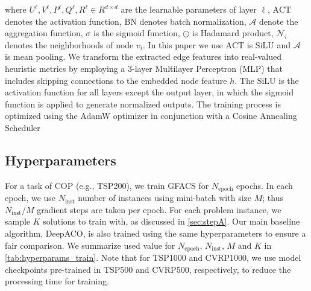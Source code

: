 \documentclass[twoside]{article}
\theoremstyle{plain}
\theoremstyle{definition}
\theoremstyle{remark}
\begin{document}
where $U^\ell, V^\ell, P^\ell, Q^\ell, R^\ell \in R^{d \times d}$ are the learnable parameters of layer $\ell$, $\text{ACT}$ denotes the activation function, BN \citep{ioffe2015batch} denotes batch normalization, $\mathcal{A}$ denote the aggregation function, $\sigma$ is the sigmoid function, $\odot$ is Hadamard product, $\mathcal{N}_i$ denotes the neighborhoods of node $v_i$. In this paper we use $\text{ACT}$ is SiLU \citep{elfwing2018sigmoid} and $\mathcal{A}$ is mean pooling. We transform the extracted edge features into real-valued heuristic metrics by employing a 3-layer Multilayer Perceptron (MLP) that includes skipping connections to the embedded node feature $h$. The SiLU is the activation function for all layers except the output layer, in which the sigmoid function is applied to generate normalized outputs. The training process is optimized using the AdamW optimizer \citep{loshchilov2017decoupled} in conjunction with a Cosine Annealing Scheduler \citep{loshchilov2016sgdr}


\subsection{Hyperparameters}\label{sec:hyperparams}

\begin{table}[ht]
    \centering
    \vspace{-5pt}
    \caption{Training hyperparameter settings for each task. These hyperparameter settings are used both for GFACS and DeepACO training. The values with * indicate that the values are used for fine-tuning a pre-trained model.}
    \resizebox{1.0\linewidth}{!}{}
    \label{tab:hyperparams_train}
    \vspace{0pt}
\end{table}

For a task of COP (e.g., TSP200), we train GFACS for $N_{\text{epoch}}$ epochs. In each epoch, we use $N_{\text{inst}}$ number of instances using mini-batch with size $M$; thus $N_{\text{inst}} / M$ gradient steps are taken per epoch. For each problem instance, we sample $K$ solutions to train with, as discussed in \cref{sec:stepA}. Our main baseline algorithm, DeepACO, is also trained using the same hyperparameters to ensure a fair comparison. We summarize used value for $N_{\text{epoch}}$, $N_{\text{inst}}$, $M$ and $K$ in \cref{tab:hyperparams_train}. Note that for TSP1000 and CVRP1000, we use model checkpoints pre-trained in TSP500 and CVRP500, respectively, to reduce the processing time for training.
\end{document}
